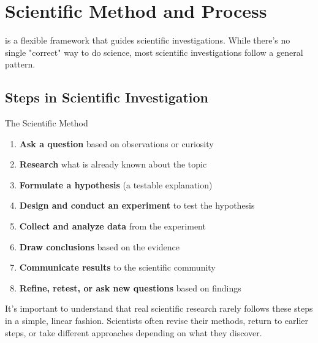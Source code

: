 
\section{Scientific Method and Process}

 is a flexible framework that guides scientific investigations. While there's no single "correct" way to do science, most scientific investigations follow a general pattern.

\subsection{Steps in Scientific Investigation}

\begin{keyconcept}{The Scientific Method}
\begin{enumerate}
    \item \textbf{Ask a question} based on observations or curiosity
    \item \textbf{Research} what is already known about the topic
    \item \textbf{Formulate a hypothesis} (a testable explanation)
    \item \textbf{Design and conduct an experiment} to test the hypothesis
    \item \textbf{Collect and analyze data} from the experiment
    \item \textbf{Draw conclusions} based on the evidence
    \item \textbf{Communicate results} to the scientific community
    \item \textbf{Refine, retest, or ask new questions} based on findings
\end{enumerate}
\end{keyconcept}


It's important to understand that real scientific research rarely follows these steps in a simple, linear fashion. Scientists often revise their methods, return to earlier steps, or take different approaches depending on what they discover.

